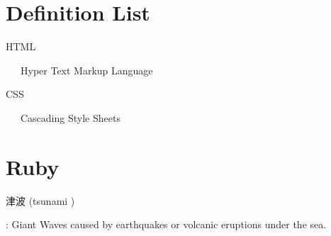 \documentclass[pdflatex, a4paper, 10pt, jadriver=standard]{bxjsarticle}
\begin{document}
\section*{\Large Definition List}
  HTML\par
  ~~~Hyper Text Markup Language
  \par
CSS
  \par
~~~Cascading Style Sheets\par
  
\section*{\Large Ruby}
    
        津波
        (tsunami
)
    
    : Giant Waves caused by earthquakes or volcanic eruptions under the sea. 
    
\end{document}
